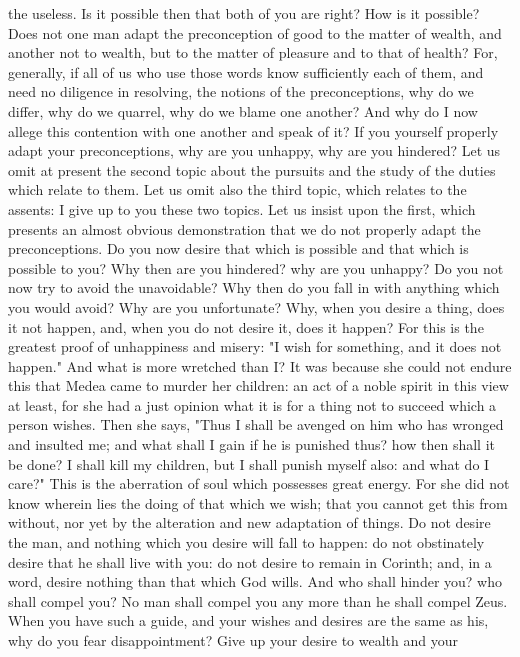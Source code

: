 \documentclass[a4paper]{article}
\begin{document}
the useless. Is it possible then that both of you are right? How is it
possible? Does not one man adapt the preconception of good to the matter of
wealth, and another not to wealth, but to the matter of pleasure and to that of
health? For, generally, if all of us who use those words know sufficiently each
of them, and need no diligence in resolving, the notions of the preconceptions,
why do we differ, why do we quarrel, why do we blame one another?
    And why do I now allege this contention with one another and speak of it?
If you yourself properly adapt your preconceptions, why are you unhappy, why
are you hindered? Let us omit at present the second topic about the pursuits
and the study of the duties which relate to them. Let us omit also the third
topic, which relates to the assents: I give up to you these two topics. Let us
insist upon the first, which presents an almost obvious demonstration that we
do not properly adapt the preconceptions. Do you now desire that which is
possible and that which is possible to you? Why then are you hindered? why are
you unhappy? Do you not now try to avoid the unavoidable? Why then do you fall
in with anything which you would avoid? Why are you unfortunate? Why, when you
desire a thing, does it not happen, and, when you do not desire it, does it
happen? For this is the greatest proof of unhappiness and misery: "I wish for
something, and it does not happen." And what is more wretched than I?
    It was because she could not endure this that Medea came to murder her
children: an act of a noble spirit in this view at least, for she had a just
opinion what it is for a thing not to succeed which a person wishes. Then she
says, "Thus I shall be avenged on him who has wronged and insulted me; and what
shall I gain if he is punished thus? how then shall it be done? I shall kill my
children, but I shall punish myself also: and what do I care?" This is the
aberration of soul which possesses great energy. For she did not know wherein
lies the doing of that which we wish; that you cannot get this from without,
nor yet by the alteration and new adaptation of things. Do not desire the man,
and nothing which you desire will fall to happen: do not obstinately desire
that he shall live with you: do not desire to remain in Corinth; and, in a
word, desire nothing than that which God wills. And who shall hinder you? who
shall compel you? No man shall compel you any more than he shall compel Zeus.
    When you have such a guide, and your wishes and desires are the same as
his, why do you fear disappointment? Give up your desire to wealth and your
\end{document}
